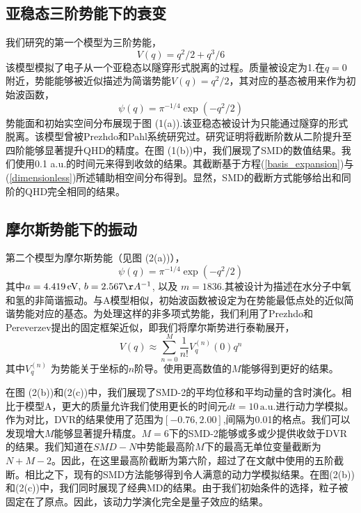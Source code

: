 \subsection{亚稳态三阶势能下的衰变}
我们研究的第一个模型为三阶势能，
\begin{equation}
	V(q)=q^{2} / 2+q^{3} / 6
\end{equation}
该模型模拟了电子从一个亚稳态以隧穿形式脱离的过程。质量被设定为1.在$q=0$附近，势能能够被近似描述为简谐势能$V(q)=q^2/2$，其对应的基态被用来作为初始波函数，
\begin{equation}
	\psi(q)=\pi^{-1 / 4} \exp \left(-q^{2} / 2\right)
\end{equation}
势能面和初始实空间分布展现于图 (1(a)).该亚稳态被设计为只能通过隧穿的形式脱离。该模型曾被Prezhdo和Pahl系统研究过。研究证明将截断阶数从二阶提升至四阶能够显著提升QHD的精度。在图 (1(b))中，我们展现了SMD的数值结果。我们使用0.1 a.u.的时间元来得到收敛的结果。其截断基于方程(\ref{basis_expansion})与(\ref{dimensionless})所述辅助相空间分布得到。显然，SMD的截断方式能够给出和同阶的QHD完全相同的结果。


\subsection{摩尔斯势能下的振动}
第二个模型为摩尔斯势能（见图 (2(a))），
\begin{equation}
	\psi(q)=\pi^{-1 / 4} \exp \left(-q^{2} / 2\right)
\end{equation}
其中$a=4.419 \, \mathrm{eV},\, b = 2.567 \AA ^{-1}$, 以及 $m=1836$.其被设计为描述在水分子中氧和氢的非简谐振动。与A模型相似，初始波函数被设定为在势能最低点处的近似简谐势能对应的基态。为处理这样的非多项式势能，我们利用了Prezhdo和Pereverzev提出的固定框架近似，即我们将摩尔斯势进行泰勒展开，
\begin{equation}
	V(q) \approx \sum_{n=0}^{M} \frac{1}{n !} V_{q}^{(n)}(0) q^{n}
\end{equation}
其中$V_{q}^{(n)}$ 为势能关于坐标的$n$阶导。使用更高数值的$M$能够得到更好的结果。

在图 (2(b))和(2(c))中，我们展现了SMD-2的平均位移和平均动量的含时演化。相比于模型A，更大的质量允许我们使用更长的时间元$dt=10\,\mathrm{a.u.}$进行动力学模拟。作为对比，DVR的结果使用了范围为$[-0.76,2.00]$,间隔为0.01的格点。我们可以发现增大$M$能够显著提升精度。$M=6$下的SMD-2能够或多或少提供收敛于DVR的结果。我们知道在$SMD-N$中势能最高阶$M$下的最高无单位变量截断为$N+M-2$。因此，在这里最高阶截断为第六阶，超过了在文献中使用的五阶截断。相比之下，现有的SMD方法能够得到令人满意的动力学模拟结果。在图(2(b))和(2(c))中，我们同时展现了经典MD的结果。由于我们初始条件的选择，粒子被固定在了原点。因此，该动力学演化完全是量子效应的结果。

